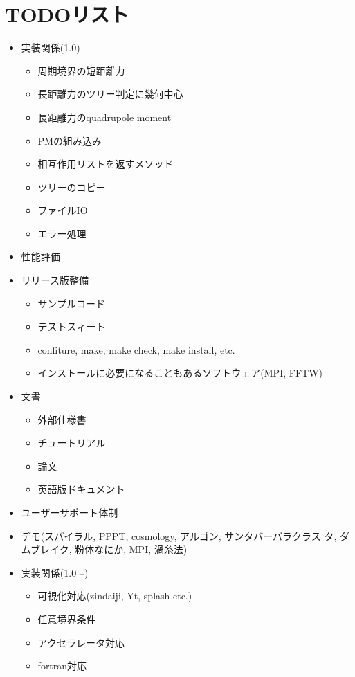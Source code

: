 \documentclass[12pt,a4paper]{jarticle}
\begin{document}
\section{TODOリスト}
\begin{itemize}
\item 実装関係(1.0)
  \begin{itemize}
  \item 周期境界の短距離力
  \item 長距離力のツリー判定に幾何中心
  \item 長距離力のquadrupole moment
  \item PMの組み込み
  \item 相互作用リストを返すメソッド
  \item ツリーのコピー
  \item ファイルIO
  \item エラー処理
  \end{itemize}
\item 性能評価
\item リリース版整備
  \begin{itemize}
  \item サンプルコード
  \item テストスィート
  \item confiture, make, make check, make install, etc.
  \item インストールに必要になることもあるソフトウェア(MPI, FFTW)
  \end{itemize}
\item 文書
  \begin{itemize}
  \item 外部仕様書
  \item チュートリアル
  \item 論文
  \item 英語版ドキュメント
  \end{itemize}  
\item ユーザーサポート体制
\item デモ(スパイラル, PPPT, cosmology, アルゴン, サンタバーバラクラス
  タ, ダムブレイク, 粉体なにか, MPI, 渦糸法)
\item 実装関係(1.0 --)
  \begin{itemize}
  \item 可視化対応(zindaiji, Yt, splash etc.)
  \item 任意境界条件
  \item アクセラレータ対応
  \item fortran対応
  \end{itemize}
\end{itemize}
\end{document}
